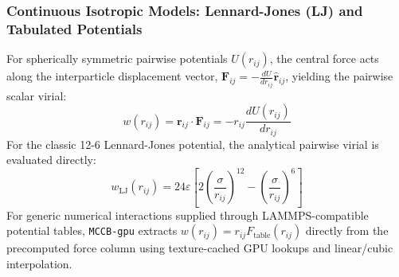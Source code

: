 \documentclass[final,5p,times,twocolumn]{elsarticle}
\begin{document}
\subsubsection{Continuous Isotropic Models: Lennard-Jones (LJ) and Tabulated Potentials}
For spherically symmetric pairwise potentials $U(r_{ij})$, the central force acts along the interparticle displacement vector, $\mathbf{F}_{ij} = -\frac{dU}{dr_{ij}} \hat{\mathbf{r}}_{ij}$, yielding the pairwise scalar virial:
\begin{equation}
    w(r_{ij}) = \mathbf{r}_{ij} \cdot \mathbf{F}_{ij} = -r_{ij} \frac{dU(r_{ij})}{dr_{ij}}
\end{equation}
For the classic 12-6 Lennard-Jones potential, the analytical pairwise virial is evaluated directly:
\begin{equation}
    w_{\text{LJ}}(r_{ij}) = 24\varepsilon \left[ 2\left(\frac{\sigma}{r_{ij}}\right)^{12} - \left(\frac{\sigma}{r_{ij}}\right)^6 \right]
\end{equation}
For generic numerical interactions supplied through LAMMPS-compatible potential tables, \texttt{MCCB-gpu} extracts $w(r_{ij}) = r_{ij} F_{\text{table}}(r_{ij})$ directly from the precomputed force column using texture-cached GPU lookups and linear/cubic interpolation.
\end{document}
